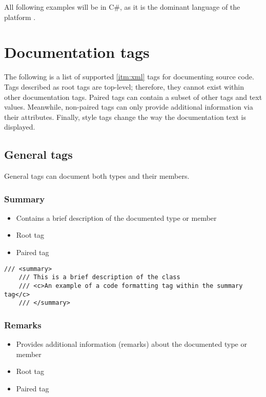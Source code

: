 All following examples will be in C\#, as it is the dominant language of the platform \cite{noauthor_tiobe_2022}.
\section{Documentation tags}

The following is a list of supported \ref{itm:xml} tags for documenting source code.
Tags described as root tags are top-level; therefore, they cannot exist within other documentation tags.
Paired tags can contain a subset of other tags and text values.
Meanwhile, non-paired tags can only provide additional information via their attributes.
Finally, style tags change the way the documentation text is displayed.

\subsection{General tags}

General tags can document both types and their members.

\subsubsection*{Summary}
\begin{itemize}
    \item Contains a brief description of the documented type or member
    \item Root tag
    \item Paired tag
\end{itemize}

\begin{lstlisting}[caption=Summary tag]
    /// <summary>
    /// This is a brief description of the class
    /// <c>An example of a code formatting tag within the summary tag</c>
    /// </summary>
\end{lstlisting}

\subsubsection*{Remarks}
\begin{itemize}
    \item Provides additional information (remarks) about the documented type or member
    \item Root tag
    \item Paired tag
\end{itemize}

